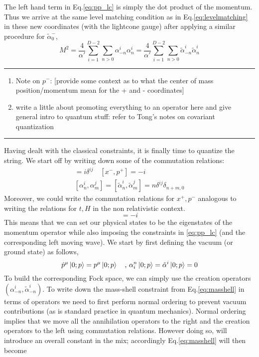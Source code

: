 \documentclass{article}
\begin{document}
The left hand term in Eq.\eqref{eq:pp_lc} is simply the dot product of the momentum. Thus we arrive at the same level matching condition as in Eq.\eqref{eq:levelmatching} in these new coordinates (with the lightcone gauge) after applying a similar procedure for $\tilde{\alpha}_0^-$,
\begin{equation}
	M^2 = \frac{4}{\alpha'}\sum_{i=1}^{D-2}\sum_{n>0}\alpha_{-n}^i\alpha_n^i=\frac{4}{\alpha'}\sum_{i=1}^{D-2}\sum_{n>0}\tilde{\alpha}_{-n}^i\tilde{\alpha}_n^i\label{eq:masshell}
\end{equation}
\hrule
\begin{enumerate}
	\item Note on $p^-$: [provide some context as to what the center of mass position/momentum mean for the + and - coordinates]
	\item write a little about promoting everything to an operator here and give general intro to quantum stuff: refer to Tong's notes on covariant quantization
\end{enumerate}
\hrule
Having dealt with the classical constraints, it is finally time to quantize the string. We start off by writing down some of the commutation relations:
\begin{align}
	[x^i,p^j] = i\delta^{ij} \quad[x^-,p^+]=-i\nonumber\\
	[\alpha^i_n,\alpha^j_m]=[\tilde{\alpha}^i_n,\tilde{\alpha}^j_m]=n\delta^{ij}\delta_{n+m,0}
\end{align}
Moreover, we could write the commutation relations for $x^+,p^-$ analogous to writing the relations for $t,H$ in the non relativistic context.
\begin{equation}
    [x^+,p^-] = -i
\end{equation}
This means that we can set our physical states to be the eigenstates of the momentum operator while also imposing the constraints in \eqref{eq:pp_lc} (and the corresponding left moving wave). We start by first defining the vacuum (or ground state) as follows,
\begin{equation}
    \hat{p}^\mu\ket{0;p}=p^\mu\ket{0;p} \quad\text{, }\alpha_i^n\ket{0;p}=\tilde{\alpha}^i\ket{0;p}=0
\end{equation}
To build the corresponding Fock space, we can simply use the creation operators $(\alpha^i_{-n}, \tilde{\alpha}^i_{-n})$. To write down the mass-shell constraint from Eq.\eqref{eq:masshell} in terms of operators we need to first perform normal ordering to prevent vacuum contributions (as is standard practice in quantum mechanics). Normal ordering implies that we move all the annihilation operators to the right and the creation operators to the left using commutation relations. However doing so, will introduce an overall constant in the mix; accordingly Eq.\eqref{eq:masshell} will then become
\end{document}
